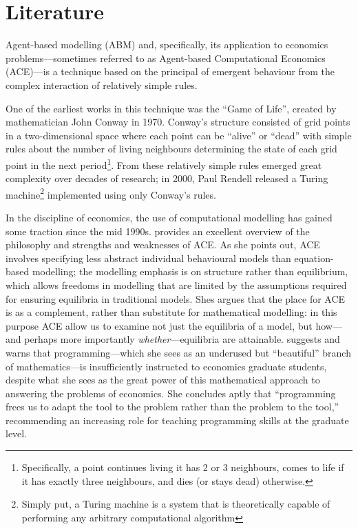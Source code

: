 \documentclass[12pt]{article}
\numberwithin{equation}{subsection}
\begin{document}
\section{Literature}\label{s:lit}

Agent-based modelling (ABM) and, specifically, its application to economics problems---sometimes
referred to as Agent-based Computational Economics (ACE)---is a technique based on the principal of
emergent behaviour from the complex interaction of relatively simple rules.

One of the earliest works in this technique was the ``Game of Life'', created by mathematician John
Conway in 1970.  Conway's structure consisted of grid points in a two-dimensional space where each
point can be ``alive'' or ``dead'' with simple rules about the number of living neighbours
determining the state of each grid point in the next period\footnote{Specifically, a point continues
living it has 2 or 3 neighbours, comes to life if it has exactly three neighbours, and dies (or
stays dead) otherwise.}.  From these relatively simple rules emerged great complexity over decades
of research; in 2000, Paul Rendell released a Turing machine\footnote{Simply put, a Turing machine
is a system that is theoretically capable of performing any arbitrary computational algorithm}
implemented using only Conway's rules.

In the discipline of economics, the use of computational modelling has gained some traction since
the mid 1990s.  \citet{hce:Tesf} provides an excellent overview of the philosophy and strengths and
weaknesses of ACE.  As she points out, ACE involves specifying less abstract individual behavioural
models than equation-based modelling; the modelling emphasis is on structure rather than equilibrium,
which allows freedoms in modelling that are limited by the assumptions required for ensuring
equilibria in traditional models.  Shes argues that the place for ACE is as a complement, rather
than substitute for mathematical modelling: in this purpose ACE allow us to examine not just the
equilibria of a model, but how---and perhaps more importantly \emph{whether}---equilibria are
attainable.  \citeauthor{hce:Tesf} suggests and warns that programming---which she sees as an
underused but ``beautiful'' branch of mathematics---is insufficiently instructed to economics
graduate students, despite what she sees as the great power of this mathematical approach to
answering the problems of economics.  She concludes aptly that ``programming frees us to adapt the tool to
the problem rather than the problem to the tool,'' recommending an increasing role for teaching
programming skills at the graduate level.
\end{document}
